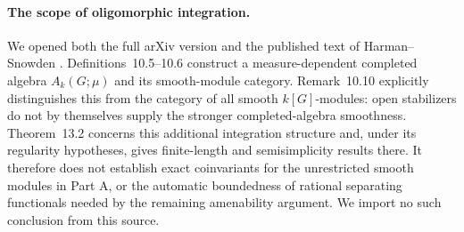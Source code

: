 \paragraph{The scope of oligomorphic integration.}
We opened both the full arXiv version and the published text of
Harman--Snowden \cite{DHarmanSnowden2026}. Definitions~10.5--10.6
construct a measure-dependent completed algebra $A_k(G;\mu)$ and
its smooth-module category. Remark~10.10 explicitly distinguishes
this from the category of all smooth $k[G]$-modules: open
stabilizers do not by themselves supply the stronger completed-algebra
smoothness. Theorem~13.2 concerns this additional integration
structure and, under its regularity hypotheses, gives finite-length
and semisimplicity results there. It therefore does not establish
exact coinvariants for the unrestricted smooth modules in Part A,
or the automatic boundedness of rational separating functionals
needed by the remaining amenability argument. We import no such
conclusion from this source.
